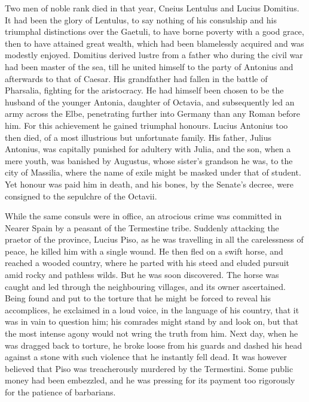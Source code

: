 Two men of noble rank died in that year, Cneius Lentulus and Lucius Domitius. It had been the glory of Lentulus, to say nothing of his consulship and his triumphal distinctions over the Gaetuli, to have borne poverty with a good grace, then to have attained great wealth, which had been blamelessly acquired and was modestly enjoyed. Domitius derived lustre from a father who during the civil war had been master of the sea, till he united himself to the party of Antonius and afterwards to that of Caesar. His grandfather had fallen in the battle of Pharsalia, fighting for the aristocracy. He had himself been chosen to be the husband of the younger Antonia, daughter of Octavia, and subsequently led an army across the Elbe, penetrating further into Germany than any Roman before him. For this achievement he gained triumphal honours. Lucius Antonius too then died, of a most illustrious but unfortunate family. His father, Julius Antonius, was capitally punished for adultery with Julia, and the son, when a mere youth, was banished by Augustus, whose sister's grandson he was, to the city of Massilia, where the name of exile might be masked under that of student. Yet honour was paid him in death, and his bones, by the Senate's decree, were consigned to the sepulchre of the Octavii.


While the same consuls were in office, an atrocious crime was committed in Nearer Spain by a peasant of the Termestine tribe. Suddenly attacking the praetor of the province, Lucius Piso, as he was travelling in all the carelessness of peace, he killed him with a single wound. He then fled on a swift horse, and reached a wooded country, where he parted with his steed and eluded pursuit amid rocky and pathless wilds. But he was soon discovered. The horse was caught and led through the neighbouring villages, and its owner ascertained. Being found and put to the torture that he might be forced to reveal his accomplices, he exclaimed in a loud voice, in the language of his country, that it was in vain to question him; his comrades might stand by and look on, but that the most intense agony would not wring the truth from him. Next day, when he was dragged back to torture, he broke loose from his guards and dashed his head against a stone with such violence that he instantly fell dead. It was however believed that Piso was treacherously murdered by the Termestini. Some public money had been embezzled, and he was pressing for its payment too rigorously for the patience of barbarians.

